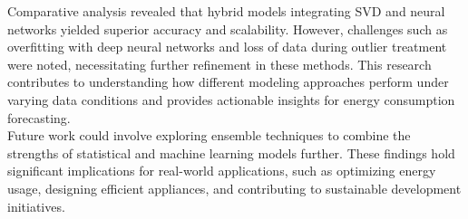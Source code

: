 \documentclass[english,12pt, titlepage]{article}
\begin{document}
	Comparative analysis revealed that hybrid models integrating SVD and neural networks yielded superior accuracy and scalability. However, challenges such as overfitting with deep neural networks and loss of data during outlier treatment were noted, necessitating further refinement in these methods. This research contributes to understanding how different modeling approaches perform under varying data conditions and provides actionable insights for energy consumption forecasting.\\
	
	Future work could involve exploring ensemble techniques to combine the strengths of statistical and machine learning models further. These findings hold significant implications for real-world applications, such as optimizing energy usage, designing efficient appliances, and contributing to sustainable development initiatives.
	
	\clearpage
	
\end{document}
